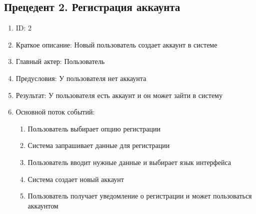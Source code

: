 \documentclass{article}
\begin{document}
\subsection{Прецедент 2. Регистрация аккаунта}
\begin{enumerate}
    \item ID: 2
    \item Краткое описание: Новый пользователь создает аккаунт в системе
    \item Главный актер: Пользователь
    \item Предусловия: У пользователя нет аккаунта
    \item Результат: У пользователя есть аккаунт и он может зайти в систему
    \item Основной поток событий:
    \begin{enumerate}
        \item Пользователь выбирает опцию регистрации
        \item Система запрашивает данные для регистрации
        \item Пользователь вводит нужные данные и выбирает язык интерфейса
        \item Система создает новый аккаунт
        \item Пользователь получает уведомление о регистрации и может пользоваться аккаунтом
    \end{enumerate}
\end{enumerate}
\end{document}
